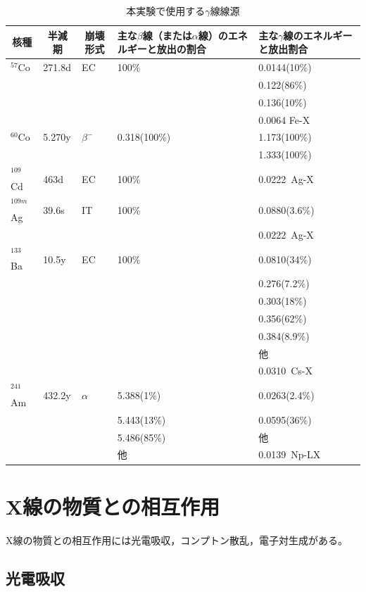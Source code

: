 \begin{table}[H]
\begin{center}
\begin{tabular}{|l|l|l|l|l|} \hline
\multicolumn{1}{|c|}{核種} & \multicolumn{1}{c|}{半減期} & \multicolumn{1}{c|}{崩壊形式} &\parbox{12zw}{主な$\beta$線（または$\alpha$線）のエネルギーと放出の割合} & \parbox{10zw}{主な$\gamma$線のエネルギーと放出割合} \\\hline
$^{57}$Co & 271.8d & EC & 100$\%$ & 0.0144(10\%) \\
 &  &  &  & 0.122(86\%) \\
 &  &  &  & 0.136(10\%) \\
 &  &  &  & 0.0064 Fe-X \\\hline
$^{60}$Co & 5.270y & $\beta^{-}$ & 0.318(100\%) & 1.173(100\%) \\
 &  &  &  & 1.333(100\%) \\\hline
$^{109}$Cd & 463d & EC & 100\% & 0.0222\ Ag-X \\
$^{109m}$Ag & 39.6s & IT & 100\% & 0.0880(3.6\%) \\
 &  &  &  & 0.0222\ Ag-X \\\hline
$^{133}$Ba & 10.5y & EC & 100\% & 0.0810(34\%) \\
 &  &  &  & 0.276(7.2\%) \\
 &  &  &  & 0.303(18\%) \\
 &  &  &  & 0.356(62\%) \\
 &  &  &  & 0.384(8.9\%) \\
 &  &  &  & 他 \\
 &  &  &  & 0.0310\ Cs-X \\\hline
$^{241}$Am & 432.2y & $\alpha$ & 5.388(1\%) & 0.0263(2.4\%) \\
 &  &  & 5.443(13\%) & 0.0595(36\%) \\
 &  &  & 5.486(85\%) & 他 \\
 &  &  & 他 & 0.0139\ Np-LX \\\hline
\end{tabular}
\end{center}
\caption{本実験で使用する$\gamma$線線源\cite{RI}}
\label{RI}
\end{table}

\fi
%

\section{X線の物質との相互作用}
X線の物質との相互作用には光電吸収，コンプトン散乱，電子対生成がある。
\subsection{光電吸収}

